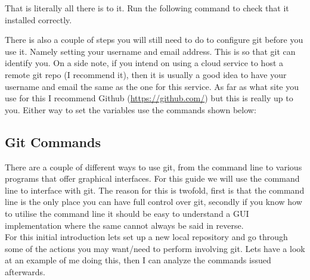 \documentclass[a4paper,11pt]{report}
\begin{document}
\begin{description}
								

								That is literally all there is to it. Run the following command to check that it installed correctly.

								

								There is also a couple of steps you will still need to do to configure git before you use it. Namely setting your username and email address. This is so that git can identify you.
								On a side note, if you intend on using a cloud service to host a remote git repo (I recommend it), then it is usually a good idea to have your username and email the same as the one for this service.
								As far as what site you use for this I recommend Github (\url{https://github.com/}) but this is really up to you.
								Either way to set the variables use the commands shown below:

								

						\subsection{Git Commands}
							There are a couple of different ways to use git, from the command line to various programs that offer graphical interfaces. For this guide we will use the command line to interface with git.
							The reason for this is twofold, first is that the command line is the only place you can have full control over git, secondly if you know how to utilise the command line it should be easy to understand a GUI implementation where the same cannot always be said in reverse.\\

							For this initial introduction lets set up a new local repository and go through some of the actions you may want/need to perform involving git.
							Lets have a look at an example of me doing this, then I can analyze the commands issued afterwards.

							


\end{description}
\end{document}
